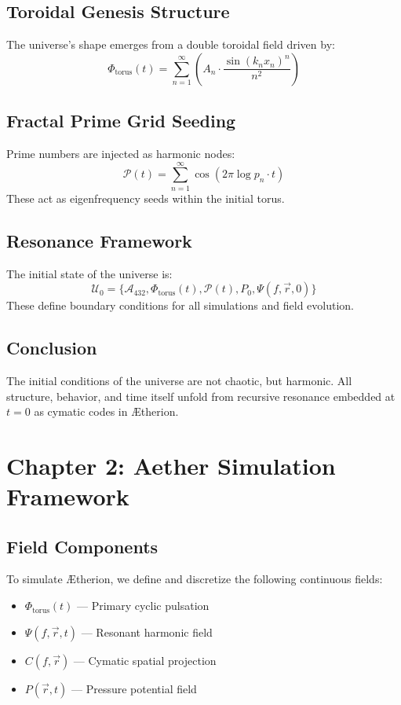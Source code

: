 \documentclass[12pt]{book}
\begin{document}
\subsection*{Toroidal Genesis Structure}
The universe's shape emerges from a double toroidal field driven by:
\[
\Phi_{\text{torus}}(t) = \sum_{n=1}^\infty \left( A_n \cdot \frac{\sin(k_n x_n)^n}{n^2} \right)
\]

\subsection*{Fractal Prime Grid Seeding}
Prime numbers are injected as harmonic nodes:
\[
\mathcal{P}(t) = \sum_{n=1}^\infty \cos(2\pi \log p_n \cdot t)
\]
These act as eigenfrequency seeds within the initial torus.

\subsection*{Resonance Framework}
The initial state of the universe is:
\[
\mathcal{U}_0 = \{ \mathcal{A}_{432}, \Phi_{\text{torus}}(t), \mathcal{P}(t), P_0, \Psi(f, \vec{r}, 0) \}
\]
These define boundary conditions for all simulations and field evolution.

\subsection*{Conclusion}
The initial conditions of the universe are not chaotic, but harmonic. All structure, behavior, and time itself unfold from recursive resonance embedded at \( t = 0 \) as cymatic codes in Ætherion.


\section*{Chapter 2: Aether Simulation Framework}

\subsection*{Field Components}
To simulate Ætherion, we define and discretize the following continuous fields:
\begin{itemize}
  \item $\Phi_{\text{torus}}(t)$ — Primary cyclic pulsation
  \item $\Psi(f, \vec{r}, t)$ — Resonant harmonic field
  \item $C(f, \vec{r})$ — Cymatic spatial projection
  \item $P(\vec{r}, t)$ — Pressure potential field
\end{itemize}
\end{document}
